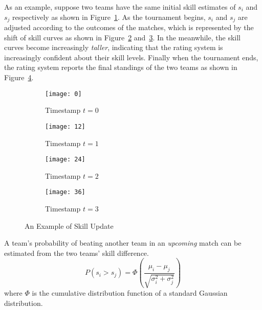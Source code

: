 As an example, suppose two teams have the same initial skill estimates of $s_{i}$ and $s_{j}$ respectively as shown in Figure~\ref{Fig:t_0}. As the tournament begins, $s_{i}$ and $s_{j}$ are adjusted according to the outcomes of the matches, which is represented by the shift of skill curves as shown in Figure~\ref{Fig:t_1} and~\ref{Fig:t_2}. In the meanwhile, the skill curves become increasingly \emph{taller}, indicating that the rating system is increasingly confident about their skill levels. Finally when the tournament ends, the rating system reports the final standings of the two teams as shown in Figure~\ref{Fig:t_3}.
\begin{figure}[h!]

\begin{subfigure}{.5\textwidth}
\centering
\texttt{[image: 0]}
\caption{Timestamp $t = 0$}
\label{Fig:t_0}
\end{subfigure}
\begin{subfigure}{.5\textwidth}
\centering
\texttt{[image: 12]}
\caption{Timestamp $t = 1$}
\label{Fig:t_1}
\end{subfigure}

\begin{subfigure}{.5\textwidth}
\centering
\texttt{[image: 24]}
\caption{Timestamp $t = 2$}
\label{Fig:t_2}
\end{subfigure}
\begin{subfigure}{.5\textwidth}
\centering
\texttt{[image: 36]}
\caption{Timestamp $t = 3$}
\label{Fig:t_3}
\end{subfigure}

\caption{An Example of Skill Update}
\label{Fig:skill_update}
\end{figure}

A team's probability of beating another team in an \emph{upcoming} match can be estimated from the two teams' skill difference. 
\begin{equation}
P(s_{i} > s_{j}) = \Phi(\frac{\mu_{i} - \mu_{j}}{\sqrt{\sigma_{i}^{2} + \sigma_{j}^{2}}})
\end{equation}
where $\Phi$ is the cumulative distribution function of a standard Gaussian distribution.